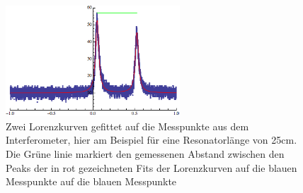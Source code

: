 \documentclass[bigchapter,colorback,accentcolor=tud4b,linedtoc,11pt]{tudreport}
\numberwithin{equation}{subsection}
\begin{document}
\begin{figure}[h!]
  \centering
    \includegraphics[width=65mm]{img/Modenabstand25cm.png}
  \caption{Zwei Lorenzkurven gefittet auf die Messpunkte aus dem Interferometer, hier am Beispiel für eine Resonatorlänge von 25cm. Die Grüne linie markiert den gemessenen Abstand zwischen den Peaks der in rot gezeichneten Fits der Lorenzkurven auf die blauen Messpunkte auf die blauen Messpunkte}
\end{figure}
\FloatBarrier
\end{document}
